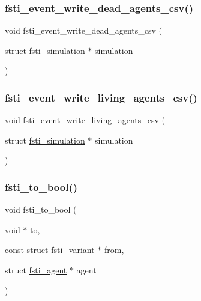 \subsubsection{\texorpdfstring{fsti\+\_\+event\+\_\+write\+\_\+dead\+\_\+agents\+\_\+csv()}{fsti\_event\_write\_dead\_agents\_csv()}}
{\footnotesize\ttfamily void fsti\+\_\+event\+\_\+write\+\_\+dead\+\_\+agents\+\_\+csv (\begin{DoxyParamCaption}\item[{struct \mbox{\hyperlink{structfsti__simulation}{fsti\+\_\+simulation}} $\ast$}]{simulation }\end{DoxyParamCaption})}

\mbox{\label{fsti-events_8h_a465aa2a48afeb4e334293b212ce04758}} 
\subsubsection{\texorpdfstring{fsti\+\_\+event\+\_\+write\+\_\+living\+\_\+agents\+\_\+csv()}{fsti\_event\_write\_living\_agents\_csv()}}
{\footnotesize\ttfamily void fsti\+\_\+event\+\_\+write\+\_\+living\+\_\+agents\+\_\+csv (\begin{DoxyParamCaption}\item[{struct \mbox{\hyperlink{structfsti__simulation}{fsti\+\_\+simulation}} $\ast$}]{simulation }\end{DoxyParamCaption})}

\mbox{\label{fsti-events_8h_a4e7751c7aa6ac604615cc3829150d828}} 
\subsubsection{\texorpdfstring{fsti\+\_\+to\+\_\+bool()}{fsti\_to\_bool()}}
{\footnotesize\ttfamily void fsti\+\_\+to\+\_\+bool (\begin{DoxyParamCaption}\item[{void $\ast$}]{to,  }\item[{const struct \mbox{\hyperlink{structfsti__variant}{fsti\+\_\+variant}} $\ast$}]{from,  }\item[{struct \mbox{\hyperlink{structfsti__agent}{fsti\+\_\+agent}} $\ast$}]{agent }\end{DoxyParamCaption})}

